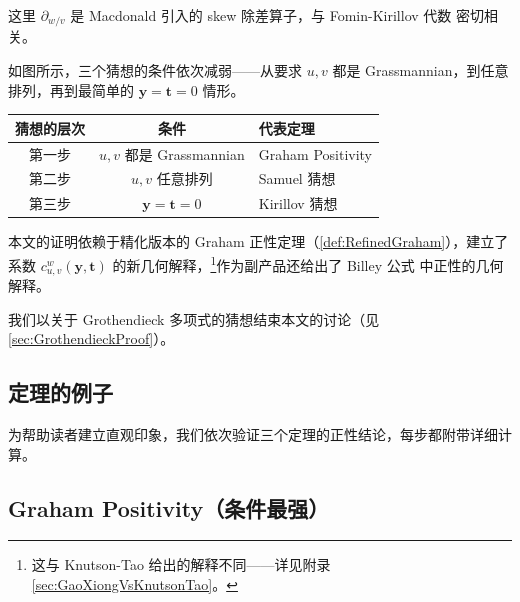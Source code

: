 这里 $\partial_{w/v}$ 是 Macdonald \cite{macdonald1991} 引入的 skew 除差算子，与 Fomin-Kirillov 代数 \cite{fomin1999} 密切相关。

如图所示，三个猜想的条件依次减弱——从要求 $u, v$ 都是 Grassmannian，到任意排列，再到最简单的 $\mathbf{y} = \mathbf{t} = 0$ 情形。

\begin{center}
\begin{tabular}{ccl}
\toprule
猜想的层次 & 条件 & 代表定理 \\ \midrule
第一步 & $u, v$ 都是 Grassmannian & Graham Positivity \\
第二步 & $u, v$ 任意排列 & Samuel 猜想 \\
第三步 & $\mathbf{y} = \mathbf{t} = 0$ & Kirillov 猜想 \\
\bottomrule
\end{tabular}
\end{center}

本文的证明依赖于精化版本的 Graham 正性定理（\cref{def:RefinedGraham}），建立了系数 $c^w_{u,v}(\mathbf{y}, \mathbf{t})$ 的新几何解释，\footnote{这与 Knutson-Tao \cite{knutson2003} 给出的解释不同——详见附录 \cref{sec:GaoXiongVsKnutsonTao}。}作为副产品还给出了 Billey 公式 \cite{billey1999} 中正性的几何解释。

我们以关于 Grothendieck 多项式的猜想结束本文的讨论（见\cref{sec:GrothendieckProof}）。

\subsection{定理的例子}
\label{sec:TheoremExamples}

为帮助读者建立直观印象，我们依次验证三个定理的正性结论，每步都附带详细计算。

\subsection{Graham Positivity（条件最强）}

